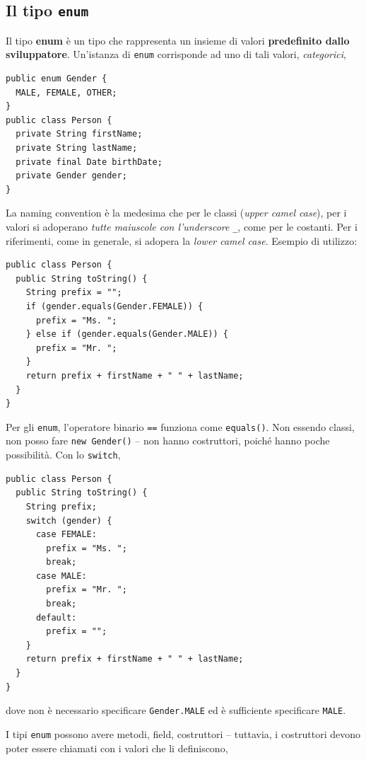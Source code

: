 \documentclass[\fontsizeclass,twocolumn]{\classname}
\theoremstyle{definition}
\theoremstyle{definition}
\begin{document}
\subsection{Il tipo \texttt{enum}}

Il tipo \textbf{enum} è un tipo che rappresenta un insieme di valori
\textbf{predefinito dallo sviluppatore}. Un'istanza di \texttt{enum}
corrisponde ad uno di tali valori, \emph{categorici},

\begin{lstlisting}
public enum Gender {
  MALE, FEMALE, OTHER;
}
public class Person {
  private String firstName;
  private String lastName;
  private final Date birthDate;
  private Gender gender;
}
\end{lstlisting}

La naming convention è la medesima che per le classi (\emph{upper camel case}),
per i valori si adoperano \emph{tutte maiuscole con l'underscore} \texttt{\_},
come per le costanti. Per i riferimenti, come in generale, si adopera la
\emph{lower camel case}. Esempio di utilizzo:

\begin{lstlisting}
public class Person {
  public String toString() {
    String prefix = "";
    if (gender.equals(Gender.FEMALE)) {
      prefix = "Ms. ";
    } else if (gender.equals(Gender.MALE)) {
      prefix = "Mr. ";
    }
    return prefix + firstName + " " + lastName;
  }
}
\end{lstlisting}

Per gli \texttt{enum}, l'operatore binario \texttt{==} funziona come
\texttt{equals()}. Non essendo classi, non posso fare \texttt{new Gender()} --
non hanno costruttori, poiché hanno poche possibilità. Con lo \texttt{switch},

\begin{lstlisting}
public class Person {
  public String toString() {    
    String prefix;
    switch (gender) {
      case FEMALE:
        prefix = "Ms. ";
        break;
      case MALE:
        prefix = "Mr. ";
        break;
      default:
        prefix = "";
    }
    return prefix + firstName + " " + lastName;
  }
}
\end{lstlisting}

dove non è necessario specificare \texttt{Gender.MALE} ed è sufficiente
specificare \texttt{MALE}.

I tipi \texttt{enum} possono avere metodi, field, costruttori -- tuttavia, i
costruttori devono poter essere chiamati con i valori che li definiscono,
\end{document}
